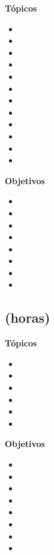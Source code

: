\textbf{Tópicos}
\begin{itemize}
	\item \PFTRESTopicTipos
	\item \PFTRESTopicArreglos
	\item \PFTRESTopicRegistros
	\item \PFTRESTopicCadenas
	\item \PFTRESTopicRepresentacion
	\item \PFTRESTopicAsignacion
	\item \PFTRESTopicAdministracion
	\item \PFTRESTopicPunteros
	\item \PFTRESTopicEstructuras
	\item \PFTRESTopicEstrategias
	\item \PFTRESTopicEstrategiasde
	\item \PFTRESTopicEstrategiaspara
\end{itemize}

\textbf{Objetivos}
\begin{itemize}
	\item \PFTRESObjUNO
	\item \PFTRESObjDOS
	\item \PFTRESObjTRES
	\item \PFTRESObjCUATRO
	\item \PFTRESObjCINCO
	\item \PFTRESObjSEIS
	\item \PFTRESObjSIETE
	\item \PFTRESObjOCHO
\end{itemize}

\subsection{\PFCUATRODef  (\PFCUATROHours horas)}\label{sec:BOK-PF4}

\textbf{Tópicos}
\begin{itemize}
	\item \PFCUATROTopicEl
	\item \PFCUATROTopicFunciones
	\item \PFCUATROTopicProcedimientos
	\item \PFCUATROTopicEstrategias
	\item \PFCUATROTopicBacktracking
	\item \PFCUATROTopicImplementacion
\end{itemize}

\textbf{Objetivos}
\begin{itemize}
	\item \PFCUATROObjUNO
	\item \PFCUATROObjDOS
	\item \PFCUATROObjTRES
	\item \PFCUATROObjCUATRO
	\item \PFCUATROObjCINCO
	\item \PFCUATROObjSEIS
	\item \PFCUATROObjSIETE
	\item \PFCUATROObjOCHO
\end{itemize}

